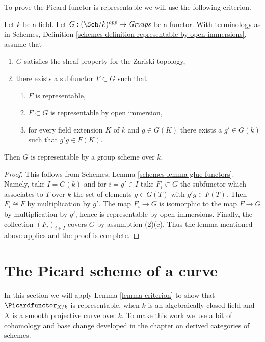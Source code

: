 \noindent
To prove the Picard functor is representable we will use the following
criterion.

\begin{lemma}
\label{lemma-criterion}
Let $k$ be a field. Let $G : (\Sch/k)^{opp} \to \textit{Groups}$ be a
functor. With terminology as in
Schemes, Definition \ref{schemes-definition-representable-by-open-immersions},
assume that
\begin{enumerate}
\item $G$ satisfies the sheaf property for the Zariski topology,
\item there exists a subfunctor $F \subset G$ such that
\begin{enumerate}
\item $F$ is representable,
\item $F \subset G$ is representable by open immersion,
\item for every field extension $K$ of $k$ and $g \in G(K)$
there exists a $g' \in G(k)$ such that $g'g \in F(K)$.
\end{enumerate}
\end{enumerate}
Then $G$ is representable by a group scheme over $k$.
\end{lemma}

\begin{proof}
This follows from Schemes, Lemma \ref{schemes-lemma-glue-functors}.
Namely, take $I = G(k)$ and for $i = g' \in I$ take $F_i \subset G$
the subfunctor which associates to $T$ over $k$ the set of elements
$g \in G(T)$ with $g'g \in F(T)$. Then $F_i \cong F$ by multiplication
by $g'$. The map $F_i \to G$ is isomorphic to the map $F \to G$
by multiplication by $g'$, hence is representable by open immersions.
Finally, the collection $(F_i)_{i \in I}$ covers $G$ by assumption (2)(c).
Thus the lemma mentioned above applies and the proof is complete.
\end{proof}



\section{The Picard scheme of a curve}
\label{section-picard-curve}

\noindent
In this section we will apply Lemma \ref{lemma-criterion} to show that
$\Picardfunctor_{X/k}$ is representable, when $k$ is an algebraically
closed field and $X$ is a smooth projective curve over $k$. To make this
work we use a bit of cohomology and base change developed in
the chapter on derived categories of schemes.

